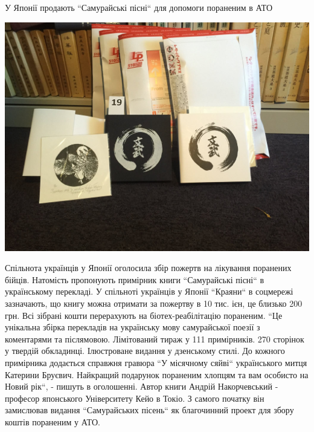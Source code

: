 \documentclass[10pt,a4paper]{article}
\newcommand{\NewsItem}[1]{%
		\usefont{T2A}{iwona}{m}{n} 
		\large #1 \vspace{4pt}
		\par \normalsize \normalfont}
\newcommand{\NewsAuthor}[1]{%
			\hfill \textsc{#1} \vspace{4pt}
			\par \normalfont}
\begin{document}
\begin{multicols}{3}

\NewsItem{У Японії продають ``Самурайські пісні`` для допомоги пораненим в АТО}
\begin{center}
\includegraphics[width=0.8\linewidth]{images/6}
\end{center}
Спільнота українців у Японії оголосила збір пожертв на лікування поранених бійців. Натомість пропонують примірник книги ``Самурайські пісні`` в українському перекладі. У спільноті українців у Японії ``Краяни`` в соцмережі зазначають, що книгу можна отримати за пожертву в 10 тис. ієн, це близько 200 грн. Всі зібрані кошти перерахують на біотех-реабілітацію пораненим. ``Це унікальна збірка перекладів на українську мову самурайської поезії з коментарями та післямовою. Лімітований тираж у 111 примірників. 270 сторінок у твердій обкладинці. Ілюстроване видання у дзенському стилі. До кожного примірника додається справжня гравюра ``У місячному сяйві`` українського митця Катерини Бруєвич. Найкращий подарунок пораненим хлопцям та вам особисто на Новий рік``, - пишуть в оголошенні. Автор книги Андрій Накорчевський - професор японського Університету Кейо в Токіо. З самого початку він замислював видання ``Самурайських пісень`` як благочинний проект для збору коштів пораненим у АТО.

\vspace{2cm}


\end{multicols}
\end{document}
